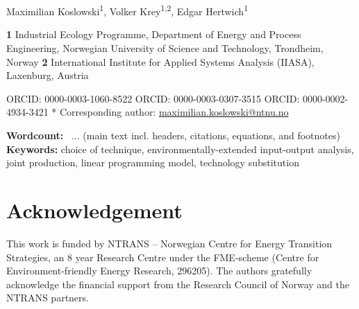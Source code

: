 \begin{titlepage}
    \begin{center}
    
    { \centering \huge \bfseries
    {\multiTitle}}
    \\[0.8cm]
    \HRule \\[1.5cm]
    
    \large
    Maximilian Koslowski\textsuperscript{1\dag*},
    Volker Krey\textsuperscript{1,2\textpilcrow},
    Edgar Hertwich\textsuperscript{1\textcurrency}
    \\
    
    \end{center}
    
    \small
    \bigskip
    \textbf{1} Industrial Ecology Programme, Department of Energy and Process Engineering, Norwegian University of Science and Technology, Trondheim, Norway
    \newline
    \textbf{2} International Institute for Applied Systems Analysis (IIASA), Laxenburg, Austria
    
    \smallskip
    
    
    \dag ORCID: 0000-0003-1060-8522
    \newline
    \textpilcrow ORCID: 0000-0003-0307-3515
    \newline
    \textcurrency ORCID: 0000-0002-4934-3421
    \newline
    * Corresponding author: \href{mailto:maximilian.koslowski@ntnu.no}{maximilian.koslowski@ntnu.no}
    
    \smallskip
    
    \textbf{Wordcount:} ~... (main text incl. headers, citations, equations, and footnotes)
    \newline
    \textbf{Keywords:} choice of technique, environmentally-extended input-output analysis, joint production, linear programming model, technology substitution
    
    
    
    \section*{Acknowledgement}
    This work is funded by NTRANS – Norwegian Centre for Energy Transition Strategies, an 8 year Research Centre under the FME-scheme (Centre for Environment-friendly Energy Research, 296205).
    The authors gratefully acknowledge the financial support from the Research Council of Norway and the NTRANS partners.


\end{titlepage}
